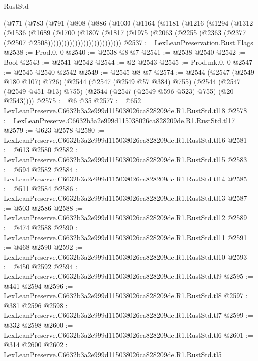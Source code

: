 \begin{lexlean}{RustStd}
\begin{coremodule}
              (@771
                (@783
                  (@791
                    (@808
                      (@886
                        (@1030
                          (@1164
                            (@1181
                              (@1216
                                (@1294
                                  (@1312
                                    (@1536
                                      (@1689
                                        (@1700
                                          (@1807
                                            (@1817
                                              (@1975
                                                (@2063
                                                  (@2255
                                                    (@2363
                                                      (@2377 (@2507 @2508)))))))))))))))))))))))))))
@2537 := LexLeanPreservation.Rust.Flags
@2538 := Prod.{0, 0}
@2540 := @2538 @8 @7
@2541 := @2538 @2540
@2542 := Bool
@2543 := @2541 @2542
@2544 := @2 @2543
@2545 := Prod.mk.{0, 0}
@2547 := @2545 @2540 @2542
@2549 := @2545 @8 @7
@2574 := @2544
    (@2547 (@2549 @180 @107) @726)
    (@2544
      (@2547 (@2549 @57 @384) @755)
      (@2544 (@2547 (@2549 @451 @13) @755) (@2544 (@2547 (@2549 @596 @523) @755) (@20 @2543))))
@2575 := @6 @35
@2577 := @652 LexLeanPreserve.C6632b3a2e999d115038026ca828209de.R1.RustStd.tl18
@2578 := LexLeanPreserve.C6632b3a2e999d115038026ca828209de.R1.RustStd.tl17
@2579 := @623 @2578
@2580 := LexLeanPreserve.C6632b3a2e999d115038026ca828209de.R1.RustStd.tl16
@2581 := @613 @2580
@2582 := LexLeanPreserve.C6632b3a2e999d115038026ca828209de.R1.RustStd.tl15
@2583 := @594 @2582
@2584 := LexLeanPreserve.C6632b3a2e999d115038026ca828209de.R1.RustStd.tl14
@2585 := @511 @2584
@2586 := LexLeanPreserve.C6632b3a2e999d115038026ca828209de.R1.RustStd.tl13
@2587 := @503 @2586
@2588 := LexLeanPreserve.C6632b3a2e999d115038026ca828209de.R1.RustStd.tl12
@2589 := @474 @2588
@2590 := LexLeanPreserve.C6632b3a2e999d115038026ca828209de.R1.RustStd.tl11
@2591 := @468 @2590
@2592 := LexLeanPreserve.C6632b3a2e999d115038026ca828209de.R1.RustStd.tl10
@2593 := @450 @2592
@2594 := LexLeanPreserve.C6632b3a2e999d115038026ca828209de.R1.RustStd.tl9
@2595 := @441 @2594
@2596 := LexLeanPreserve.C6632b3a2e999d115038026ca828209de.R1.RustStd.tl8
@2597 := @381 @2596
@2598 := LexLeanPreserve.C6632b3a2e999d115038026ca828209de.R1.RustStd.tl7
@2599 := @332 @2598
@2600 := LexLeanPreserve.C6632b3a2e999d115038026ca828209de.R1.RustStd.tl6
@2601 := @314 @2600
@2602 := LexLeanPreserve.C6632b3a2e999d115038026ca828209de.R1.RustStd.tl5

\end{coremodule}
\end{lexlean}

